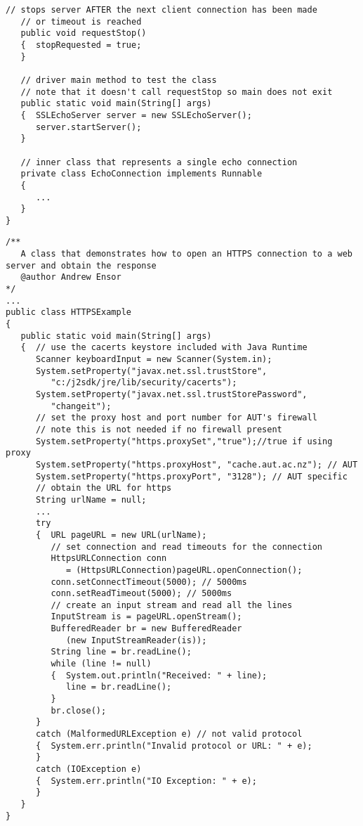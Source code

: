 \begin{lstlisting}[caption=SSL/TLS TCP message echo]
   // stops server AFTER the next client connection has been made
   // or timeout is reached
   public void requestStop()
   {  stopRequested = true;
   }

   // driver main method to test the class
   // note that it doesn't call requestStop so main does not exit
   public static void main(String[] args)
   {  SSLEchoServer server = new SSLEchoServer();
      server.startServer();
   }

   // inner class that represents a single echo connection
   private class EchoConnection implements Runnable
   {
      ...
   }
}
\end{lstlisting}

\begin{lstlisting}[caption=HTTPS connection]
/**
   A class that demonstrates how to open an HTTPS connection to a web server and obtain the response
   @author Andrew Ensor
*/
...
public class HTTPSExample
{
   public static void main(String[] args)
   {  // use the cacerts keystore included with Java Runtime
      Scanner keyboardInput = new Scanner(System.in);
      System.setProperty("javax.net.ssl.trustStore",
         "c:/j2sdk/jre/lib/security/cacerts");
      System.setProperty("javax.net.ssl.trustStorePassword",
         "changeit");
      // set the proxy host and port number for AUT's firewall
      // note this is not needed if no firewall present
      System.setProperty("https.proxySet","true");//true if using proxy
      System.setProperty("https.proxyHost", "cache.aut.ac.nz"); // AUT
      System.setProperty("https.proxyPort", "3128"); // AUT specific
      // obtain the URL for https
      String urlName = null;
      ...
      try
      {  URL pageURL = new URL(urlName);
         // set connection and read timeouts for the connection
         HttpsURLConnection conn
            = (HttpsURLConnection)pageURL.openConnection();
         conn.setConnectTimeout(5000); // 5000ms
         conn.setReadTimeout(5000); // 5000ms
         // create an input stream and read all the lines
         InputStream is = pageURL.openStream();
         BufferedReader br = new BufferedReader
            (new InputStreamReader(is));
         String line = br.readLine();
         while (line != null)
         {  System.out.println("Received: " + line);
            line = br.readLine();
         }
         br.close();
      }
      catch (MalformedURLException e) // not valid protocol
      {  System.err.println("Invalid protocol or URL: " + e);
      }
      catch (IOException e)
      {  System.err.println("IO Exception: " + e);
      }
   }
}
\end{lstlisting}


%
%
%
%
